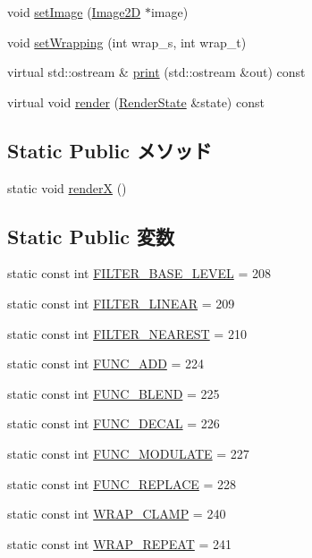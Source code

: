 \begin{CompactItemize}
\item 
void \hyperlink{classm3g_1_1Texture2D_705b89b41cd1b38f664ed912be44baaa}{setImage} (\hyperlink{classm3g_1_1Image2D}{Image2D} $\ast$image)
\item 
void \hyperlink{classm3g_1_1Texture2D_e676f34bd2f5ee1508ad1cb771702d8f}{setWrapping} (int wrap\_\-s, int wrap\_\-t)
\item 
virtual std::ostream \& \hyperlink{classm3g_1_1Texture2D_6fea17fa1532df3794f8cb39cb4f911f}{print} (std::ostream \&out) const 
\item 
virtual void \hyperlink{classm3g_1_1Texture2D_8babc8a79b78615da51161e94029eea9}{render} (\hyperlink{structm3g_1_1RenderState}{RenderState} \&state) const 
\end{CompactItemize}
\subsection*{Static Public メソッド}
\begin{CompactItemize}
\item 
static void \hyperlink{classm3g_1_1Texture2D_443a7a301f77f625335ecc06d13bad06}{renderX} ()
\end{CompactItemize}
\subsection*{Static Public 変数}
\begin{CompactItemize}
\item 
static const int \hyperlink{classm3g_1_1Texture2D_d1924d32385b5353ad11ecd8b1ec0ad5}{FILTER\_\-BASE\_\-LEVEL} = 208
\item 
static const int \hyperlink{classm3g_1_1Texture2D_5f06003f50141919a3665d22f55602a8}{FILTER\_\-LINEAR} = 209
\item 
static const int \hyperlink{classm3g_1_1Texture2D_1ee2e06d6462fdafd5f17e63eddfb8fe}{FILTER\_\-NEAREST} = 210
\item 
static const int \hyperlink{classm3g_1_1Texture2D_825ea3aff59f79958257ac557c802760}{FUNC\_\-ADD} = 224
\item 
static const int \hyperlink{classm3g_1_1Texture2D_57e3e01014bbfd62b8665586fdd2ecb3}{FUNC\_\-BLEND} = 225
\item 
static const int \hyperlink{classm3g_1_1Texture2D_235b942b18219513ca4a5a8c1a3171ac}{FUNC\_\-DECAL} = 226
\item 
static const int \hyperlink{classm3g_1_1Texture2D_4482b0d4d6d1f64aaf33c3c5862de30e}{FUNC\_\-MODULATE} = 227
\item 
static const int \hyperlink{classm3g_1_1Texture2D_14f24332e168c5e210ddad47fb5cdd17}{FUNC\_\-REPLACE} = 228
\item 
static const int \hyperlink{classm3g_1_1Texture2D_e36d8facf5b60eb6c59888121731c438}{WRAP\_\-CLAMP} = 240
\item 
static const int \hyperlink{classm3g_1_1Texture2D_b37ff061b9fb272284c4c389deec9266}{WRAP\_\-REPEAT} = 241
\end{CompactItemize}


